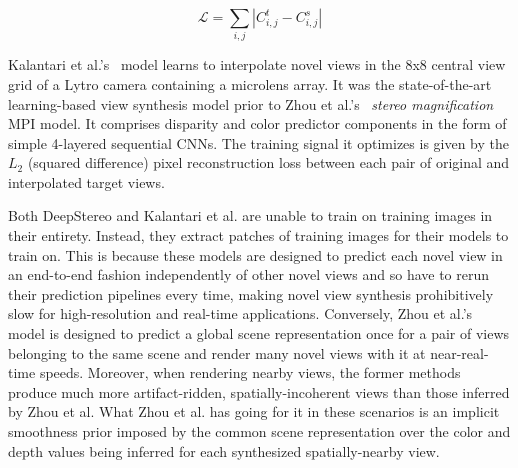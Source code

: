 \[\mathcal{L} = \sum_{i,j} |C_{i,j}^t - C_{i,j}^s|\]

Kalantari et al.'s~\cite{kalantari_2016} model learns to interpolate novel views in the 8x8 central view grid of a Lytro camera containing a microlens array. It was the state-of-the-art learning-based view synthesis model prior to Zhou et al.'s~\cite{zhou2018stereo} \textit{stereo magnification} MPI model. It comprises disparity and color predictor components in the form of simple 4-layered sequential CNNs. The training signal it optimizes is given by the $L_2$ (squared difference) pixel reconstruction loss between each pair of original and interpolated target views.

Both DeepStereo and Kalantari et al. are unable to train on training images in their entirety. Instead, they extract patches of training images for their models to train on. This is because these models are designed to predict each novel view in an end-to-end fashion independently of other novel views and so have to rerun their prediction pipelines every time, making novel view synthesis prohibitively slow for high-resolution and real-time applications. Conversely, Zhou et al.'s model is designed to predict a global scene representation once for a pair of views belonging to the same scene and render many novel views with it at near-real-time speeds. Moreover, when rendering nearby views, the former methods produce much more artifact-ridden, spatially-incoherent views than those inferred by Zhou et al. What Zhou et al. has going for it in these scenarios is an implicit smoothness prior imposed by the common scene representation over the color and depth values being inferred for each synthesized spatially-nearby view. 

